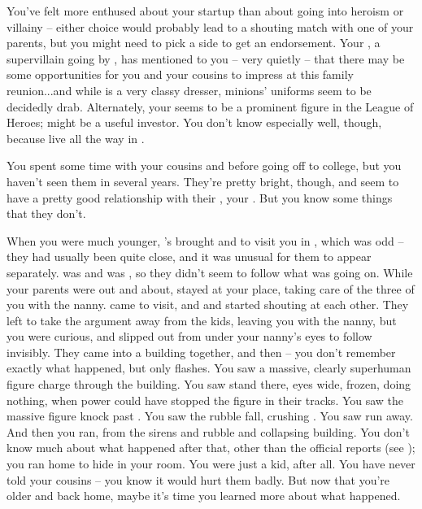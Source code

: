 \documentclass[char]{LRSguildcamp1}
\begin{document}
You've felt more enthused about your startup than about going into heroism or villainy -- either choice would probably lead to a shouting match with one of your parents, but you might need to pick a side to get an endorsement.  Your \cGrandma{\grandparent} \cGrandma{}, a supervillain going by \cGrandma{\MYsupername}, has mentioned to you -- very quietly -- that there may be some opportunities for you and your cousins to impress \cGrandma{\them} at this family reunion...and while \cGrandma{} \cGrandma{\themself} is a very classy dresser, \cGrandma{\their} minions' uniforms seem to be decidedly drab.  Alternately, your \cYoungest{\uncle} \cYoungest{} seems to be a prominent figure in the League of Heroes; \cYoungest{\they} might be a useful investor.  You don't know \cYoungest{\them} especially well, though, because \cYoungest{\they} live all the way in \pCityYoungest{}.

You spent some time with your cousins \cTeen{} and \cTween{} before going off to college, but you haven't seen them in several years.  They're pretty bright, though, and seem to have a pretty good relationship with their \cArchitect{\parent}, your \cArchitect{\uncle} \cArchitect{}.  But you know some things that they don't.

When you were much younger, \cArchitect{}'s \cAS{\spouse} \cAS{} brought \cTeen{} and \cTween{} to visit you in \pCityO{}, which was odd -- they had usually been quite close, and it was unusual for them to appear separately.  \cTeen{} was  and \cTween{} was , so they didn't seem to follow what was going on.  While your parents were out and about, \cAS{} stayed at your place, taking care of the three of you with the nanny.  \cArchitect{} came to visit, and \cArchitect{\they} and \cAS{} started shouting at each other.  They left to take the argument away from the kids, leaving you with the nanny, but you were curious, and slipped out from under your nanny's eyes to follow invisibly.  They came into a building  together, and then -- you don't remember exactly what happened, but only flashes.  You saw a massive, clearly superhuman figure charge through the building.  You saw \cArchitect{} stand there, eyes wide, frozen, doing nothing, when \cArchitect{\their} power could have stopped the figure in their tracks. You saw the massive figure knock past \cAS{}.  You saw the rubble fall, crushing \cAS{}.  You saw \cArchitect{} run away.  And then you ran, from the sirens and rubble and collapsing building.  You don't know much about what happened after that, other than the official reports (see \bChicagoIncident{}); you ran home to hide in your room.  You were just a kid, after all.
  You have never told your cousins -- you know it would hurt them badly.  But now that you're older and back home, maybe it's time you learned more about what happened. 
\end{document}
